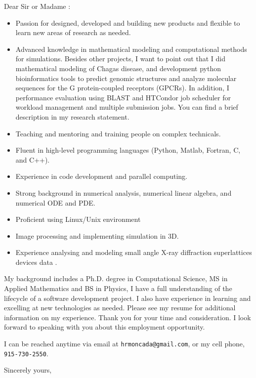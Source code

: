 \documentclass[11pt]{letter}
\begin{document}
\begin{letter}{Dear Sir or Madame :}
\begin{itemize}
 \item Passion for designed, developed and building new products and flexible to learn new areas of research as needed.
 \item Advanced knowledge in mathematical modeling and computational methods for simulations. Besides other projects, I want to point out that I did mathematical modeling of Chagas disease, and development python bioinformatics tools to predict genomic structures and analyze molecular sequences for the G protein-coupled receptors (GPCRs). In addition, I performance evaluation using BLAST and HTCondor job scheduler for workload management and multiple submission jobs.  You can find a brief description in my research statement.
 \item Teaching and mentoring and training people on complex technicals.
 \item Fluent in high-level programming languages (Python, Matlab, Fortran, C, and C++).
 \item Experience in code development and parallel computing.
 \item Strong background in numerical analysis, numerical linear algebra, and numerical ODE and PDE.
 \item Proficient using Linux/Unix environment 
 \item Image processing and implementing simulation in 3D.
 \item Experience analysing and modeling small angle X-ray diffraction superlattices devices data .
\end{itemize}
My background includes a Ph.D. degree in Computational Science, MS in Applied Mathematics and BS in Physics, 
I have a full understanding of the lifecycle of a software development project. I also have experience in learning and excelling at new technologies as needed.
Please see my resume for additional information on my experience. Thank you for your time and consideration. I look forward to speaking with you about this employment opportunity.

I can be reached anytime via email at \verb+hrmoncada@gmail.com+, or my cell phone, \verb+915-730-2550+.

\closing{Sincerely yours,} 
\end{letter}
\end{document}
